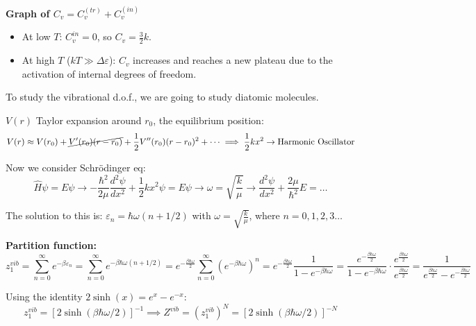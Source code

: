 \documentclass[12pt,a4paper]{report}
\newcommand{\esp}{\vspace{0.5cm}}
\begin{document}
	\esp
	
	\textbf{Graph of $C_v = C_v^{(tr)} + C_v^{(in)}$}
	\begin{itemize}
		\item At low $T$: $C_v^{in} = 0$, so $C_v = \frac{3}{2}k$.
		\item At high $T$ ($kT \gg \Delta \varepsilon$): $C_v$ increases and reaches a new plateau due to the activation of internal degrees of freedom.
	\end{itemize}
	
	\esp
	
	To study the vibrational d.o.f., we are going to study diatomic molecules.
	
	\esp
	
	$V(r)$ Taylor expansion around $r_0$, the equilibrium position:
	\begin{equation}
		V(r) \approx V(r_0) + \cancel{V'(r_0)(r-r_0)} + \frac{1}{2}V''(r_0)(r-r_0)^2 + \dots \implies \frac{1}{2}kx^2 \rightarrow \text{Harmonic Oscillator}
	\end{equation}
	
	\esp
	
	Now we consider Schrödinger eq:
	\begin{equation}
		\hat{H} \psi = E \psi \rightarrow -\frac{\hbar^2}{2\mu} \frac{d^2\psi}{dx^2} + \frac{1}{2}kx^2 \psi = E \psi \rightarrow \omega = \sqrt{\frac{k}{\mu}} \rightarrow \frac{d^2\psi}{dx^2} + \frac{2\mu}{\hbar^2}E = \dots
	\end{equation}
	
	\esp
	
	The solution to this is: $\varepsilon_n = \hbar\omega(n + 1/2)$ with $\omega = \sqrt{\frac{k}{\mu}}$, where $n = 0, 1, 2, 3 \dots$
	
	\esp
	
	\textbf{Partition function:}
	\begin{equation}
		z_1^{vib} = \sum_{n=0}^{\infty} e^{-\beta \varepsilon_n} = \sum_{n=0}^{\infty} e^{-\beta \hbar\omega(n+1/2)} = e^{-\frac{\beta\hbar\omega}{2}} \sum_{n=0}^{\infty} (e^{-\beta\hbar\omega})^n = e^{-\frac{\beta\hbar\omega}{2}} \frac{1}{1-e^{-\beta\hbar\omega}} = \frac{e^{-\frac{\beta\hbar\omega}{2}}}{1-e^{-\beta\hbar\omega}} \cdot \frac{e^{\frac{\beta\hbar\omega}{2}}}{e^{\frac{\beta\hbar\omega}{2}}} = \frac{1}{e^{\frac{\beta\hbar\omega}{2}} - e^{-\frac{\beta\hbar\omega}{2}}}
	\end{equation}
	
	\esp
	
	Using the identity $2 \sinh(x) = e^x - e^{-x}$:
	\begin{equation}
		z_1^{vib} = [2 \sinh(\beta\hbar\omega/2)]^{-1} \implies Z^{vib} = (z_1^{vib})^N = [2 \sinh(\beta\hbar\omega/2)]^{-N}
	\end{equation}
	
\end{document}
